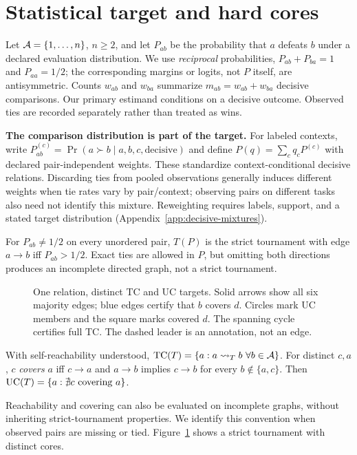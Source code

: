 \section{Statistical target and hard cores}\label{sec:problem}
Let $\mathcal{A}=\{1,\ldots,n\}$, $n\ge2$, and let $P_{ab}$ be the probability that $a$ defeats $b$ under a declared evaluation distribution. We use \emph{reciprocal} probabilities, $P_{ab}+P_{ba}=1$ and $P_{aa}=1/2$; the corresponding margins or logits, not $P$ itself, are antisymmetric. Counts $w_{ab}$ and $w_{ba}$ summarize $m_{ab}=w_{ab}+w_{ba}$ decisive comparisons. Our primary estimand conditions on a decisive outcome. Observed ties are recorded separately rather than treated as wins.

\noindent\textbf{The comparison distribution is part of the target.} For labeled contexts, write $P^{(c)}_{ab}=\Pr(a\succ b\mid a,b,c,\text{decisive})$ and define $P(q)=\sum_c q_cP^{(c)}$ with declared pair-independent weights. These standardize context-conditional decisive relations. Discarding ties from pooled observations generally induces different weights when tie rates vary by pair/context; observing pairs on different tasks also need not identify this mixture. Reweighting requires labels, support, and a stated target distribution (Appendix~\ref{app:decisive-mixtures}).

For $P_{ab}\ne1/2$ on every unordered pair, $T(P)$ is the strict tournament with edge $a\to b$ iff $P_{ab}>1/2$. Exact ties are allowed in $P$, but omitting both directions produces an incomplete directed graph, not a strict tournament.
\begin{figure}[t]
\centering

\caption{One relation, distinct TC and UC targets. Solid arrows show all six majority edges; blue edges certify that $b$ covers $d$. Circles mark UC members and the square marks covered $d$. The spanning cycle certifies full TC. The dashed leader is an annotation, not an edge.}
\label{fig:worked-tournament}
\end{figure}
\begin{definition}\label{def:cores}
With self-reachability understood, $\mathrm{TC}(T)=\{a:a\leadsto_T b\ \forall b\in\mathcal{A}\}$. For distinct $c,a$, $c$ \emph{covers} $a$ iff $c\to a$ and $a\to b$ implies $c\to b$ for every $b\notin\{a,c\}$. Then $\mathrm{UC}(T)=\{a:\nexists c\text{ covering }a\}$.
\end{definition}
Reachability and covering can also be evaluated on incomplete graphs, without inheriting strict-tournament properties. We identify this convention when observed pairs are missing or tied. Figure~\ref{fig:worked-tournament} shows a strict tournament with distinct cores.

